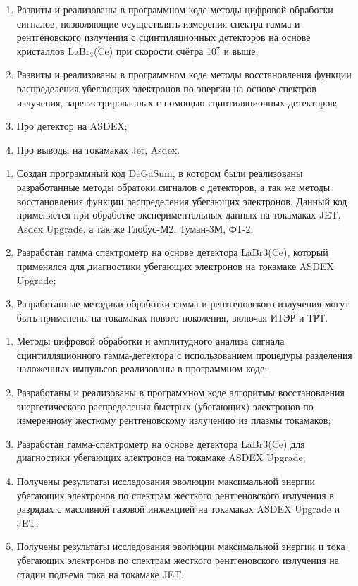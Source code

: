{\novelty}
\begin{enumerate}[beginpenalty=10000] %
  \item Развиты и реализованы в программном коде методы цифровой обработки сигналов, позволяющие осуществлять измерения спектра гамма и рентгеновского излучения с сцинтиляционных детекторов на основе кристаллов LaBr${}_3$(Ce) при скорости счётра 10${}^7$ и выше;
  \item Развиты и реализованы в программном коде методы восстановления функции распределения убегающих электронов по энергии на основе спектров излучения, зарегистрированных с помощью сцинтиляционных детекторов;
  \item Про детектор на ASDEX;
  \item Про выводы на токамаках Jet, Asdex.
\end{enumerate}

{\influence}\begin{enumerate}[beginpenalty=10000]
  \item Создан программный код DeGaSum, в котором были реализованы разработанные методы обратоки сигналов с детекторов, а так же методы восстановления функции распределения убегающих электронов. Данный код  применяется при обработке экспериментальных данных на токамаках JET, Asdex Upgrade, а так же Глобус-М2, Туман-3М, ФТ-2;
  \item Разработан гамма спектрометр на основе детектора LaBr3(Ce), который применялся для диагностики убегающих электронов на токамаке ASDEX Upgrade;
  \item Разработанные методики обработки гамма и рентгеновского излучения могут быть применены на токамаках нового поколения, включая ИТЭР и ТРТ.
\end{enumerate}

{\methods} 

{}
\begin{enumerate}[beginpenalty=10000] %
  \item Методы цифровой обработки и амплитудного анализа сигнала сцинтилляционного гамма-детектора с использованием процедуры разделения наложенных импульсов реализованы в программном коде;
  \item Разработаны и реализованы в программном коде алгоритмы восстановления энергетического распределения быстрых (убегающих) электронов по измеренному жесткому рентгеновскому излучению из плазмы токамаков;
  \item Разработан гамма-спектрометр на основе детектора LaBr3(Ce) для диагностики убегающих электронов на токамаке ASDEX Upgrade;
  \item Получены результаты исследования эволюции максимальной энергии убегающих электронов по спектрам жесткого рентгеновского излучения в разрядах с массивной газовой инжекцией на токамаках ASDEX Upgrade и JET;
  \item Получены результаты исследования эволюции максимальной энергии и тока убегающих электронов по спектрам жесткого рентгеновского излучения на стадии подъема тока на токамаке JET.
\end{enumerate}

